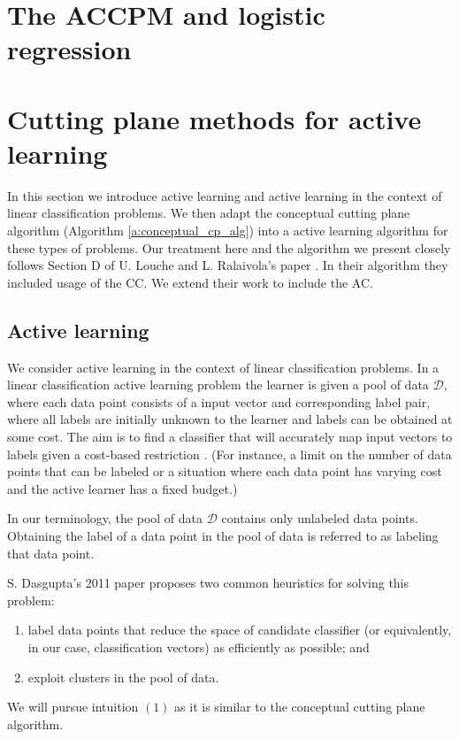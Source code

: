 \documentclass[11pt]{amsart}
\theoremstyle{definition}
\theoremstyle{remark}
\begin{document}
\section{The ACCPM and logistic regression}


\section{Cutting plane methods for active learning}\label{s:cp_active}
    In this section we introduce active learning and active learning in the context of linear classification problems. We then adapt the conceptual cutting plane algorithm (Algorithm \ref{a:conceptual_cp_alg}) into a active learning algorithm for these types of problems. Our treatment here and the algorithm we present closely follows Section D of U. Louche and L. Ralaivola's paper \cite{LR15}. In their algorithm \cite[Algorithm 4]{LR15} they included usage of the CC. We extend their work to include the AC.

    \subsection{Active learning}\label{ss:active}
        We consider active learning in the context of linear classification problems. In a linear classification active learning problem the learner is given a pool of data $\mathcal{D}$, where each data point consists of a input vector and corresponding label pair, where all labels are initially unknown to the learner and labels can be obtained at some cost. The aim is to find a classifier that will accurately map input vectors to labels given a cost-based restriction \cite{Das11}. (For instance, a limit on the number of data points that can be labeled or a situation where each data point has varying cost and the active learner has a fixed budget.)

        In our terminology, the pool of data $\mathcal{D}$ contains only unlabeled data points. Obtaining the label of a data point in the pool of data is referred to as labeling that data point.

        S. Dasgupta's 2011 paper \cite{Das11} proposes two common heuristics for solving this problem:
        \begin{enumerate}
            \item label data points that reduce the space of candidate classifier (or equivalently, in our case, classification vectors) as efficiently as possible; and
            \item exploit clusters in the pool of data.
        \end{enumerate}   
        We will pursue intuition $(1)$ as it is similar to the conceptual cutting plane algorithm. 
\end{document}
